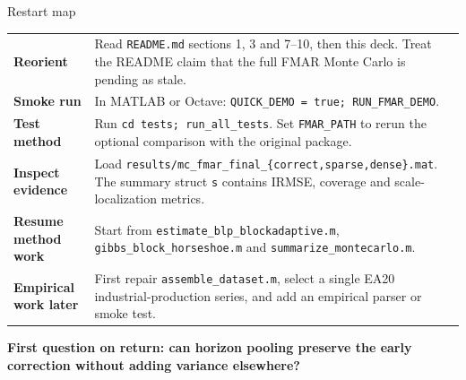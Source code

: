 \documentclass[aspectratio=169,11pt]{beamer}
\begin{document}
\begin{frame}{Restart map}
  \vspace{-1mm}
  {\fontsize{13.4}{16.8}\selectfont
  \renewcommand{\arraystretch}{1.22}
  \begin{tabularx}{\textwidth}{>{\bfseries\color{Teal}}p{} X}
    Reorient & Read \texttt{README.md} sections 1, 3 and 7--10, then this deck. Treat the README claim that the full FMAR Monte Carlo is pending as stale.\\[2.1mm]
    Smoke run & In MATLAB or Octave: \texttt{QUICK\_DEMO = true; RUN\_FMAR\_DEMO}.\\[2.1mm]
    Test method & Run \texttt{cd tests; run\_all\_tests}. Set \texttt{FMAR\_PATH} to rerun the optional comparison with the original package.\\[2.1mm]
    Inspect evidence & Load \texttt{results/mc\_fmar\_final\_\{correct,sparse,dense\}.mat}. The summary struct \texttt{s} contains IRMSE, coverage and scale-localization metrics.\\[2.1mm]
    Resume method work & Start from \texttt{estimate\_blp\_blockadaptive.m}, \texttt{gibbs\_block\_horseshoe.m} and \texttt{summarize\_montecarlo.m}.\\[2.1mm]
    Empirical work later & First repair \texttt{assemble\_dataset.m}, select a single EA20 industrial-production series, and add an empirical parser or smoke test.\\
  \end{tabularx}}

  \vfill
  {\fontsize{17}{21}\selectfont\bfseries
   First question on return: can horizon pooling preserve the early correction without adding variance elsewhere?}
\end{frame}
\end{document}
